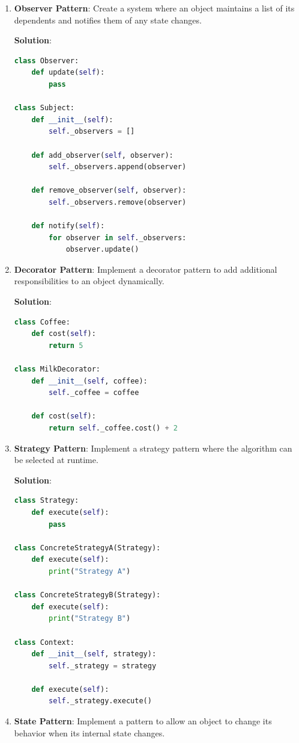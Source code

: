 \documentclass[12pt]{book}
\begin{document}
\begin{enumerate}
    \item \textbf{Observer Pattern}: Create a system where an object maintains a list of its dependents and notifies them of any state changes.

    \textbf{Solution}:
    \begin{lstlisting}[language=Python]
class Observer:
    def update(self):
        pass

class Subject:
    def __init__(self):
        self._observers = []

    def add_observer(self, observer):
        self._observers.append(observer)

    def remove_observer(self, observer):
        self._observers.remove(observer)

    def notify(self):
        for observer in self._observers:
            observer.update()
    \end{lstlisting}

    \item \textbf{Decorator Pattern}: Implement a decorator pattern to add additional responsibilities to an object dynamically.

    \textbf{Solution}:
    \begin{lstlisting}[language=Python]
class Coffee:
    def cost(self):
        return 5

class MilkDecorator:
    def __init__(self, coffee):
        self._coffee = coffee

    def cost(self):
        return self._coffee.cost() + 2
    \end{lstlisting}

    \item \textbf{Strategy Pattern}: Implement a strategy pattern where the algorithm can be selected at runtime.

    \textbf{Solution}:
    \begin{lstlisting}[language=Python]
class Strategy:
    def execute(self):
        pass

class ConcreteStrategyA(Strategy):
    def execute(self):
        print("Strategy A")

class ConcreteStrategyB(Strategy):
    def execute(self):
        print("Strategy B")

class Context:
    def __init__(self, strategy):
        self._strategy = strategy

    def execute(self):
        self._strategy.execute()
    \end{lstlisting}

    \item \textbf{State Pattern}: Implement a pattern to allow an object to change its behavior when its internal state changes.


\end{enumerate}
\end{document}
